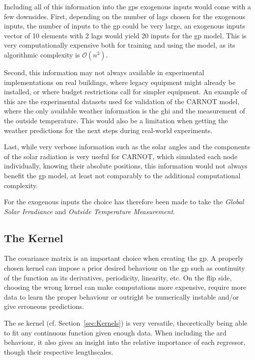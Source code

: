 Including all of this information into the \acrshort{gp}s exogenous inputs would
come with a few downsides. First, depending on the number of lags chosen for the
exogenous inputs, the number of inputs to the \acrshort{gp} could be very large,
an exogenous inputs vector of 10 elements with 2 lags would yield 20 inputs for
the \acrshort{gp} model. This is very computationally expensive both for
training and using the model, as its algorithmic complexity is
$\mathcal{O}(n^3)$.

Second, this information may not always available in experimental
implementations on real buildings, where legacy equipment might already be
installed, or where budget restrictions call for simpler equipment.  An example
of this are the experimental datasets used for validation of the CARNOT model,
where the only available weather information is the \acrshort{ghi} and the
measurement of the outside temperature. This would also be a limitation when
getting the weather predictions for the next steps during real-world
experiments.

Last, while very verbose information such as the solar angles and the components
of the solar radiation is very useful for CARNOT, which simulated each node
individually, knowing their absolute positions, this information would not
always benefit the \acrshort{gp} model, at least not comparably to the
additional computational complexity.

For the exogenous inputs the choice has therefore been made to take the
\textit{Global Solar Irradiance} and \textit{Outside Temperature Measurement}.

\subsection{The Kernel}

The covariance matrix is an important choice when creating the \acrshort{gp}. A
properly chosen kernel can impose a prior desired behaviour on the
\acrshort{gp} such as continuity of the function an its derivatives,
periodicity, linearity, etc. On the flip side, choosing the wrong kernel can
make computations more expensive, require more data to learn the proper
behaviour or outright be numerically instable and/or give erroneous predictions.

The \acrlong{se} kernel (cf. Section~\ref{sec:Kernels}) is very versatile,
theoretically being able to fit any continuous function given enough data. When
including the \acrshort{ard} behaviour, it also gives an insight into the
relative importance of each regressor, though their respective lengthscales.

